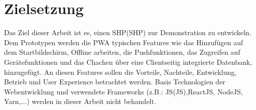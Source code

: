 \newpage
\section{Zielsetzung}\label{sub:Zielsetzung}
Das Ziel dieser Arbeit ist es, einen \acl{SHP}(\acs{SHP}) zur Demonstration zu entwickeln. 
Dem Prototypen werden die \acs{PWA} typischen Features wie das Hinzufügen auf dem Startbildschirm, Offline arbeiten, die Pushfunktionen, 
das Zugreifen auf Gerätefunktionen und das Chachen über eine Clientseitig integrierte Datenbank, hinzugefügt. 
An diesen Features sollen die Vorteile, Nachteile, Entwicklung, Betrieb und User Experience betrachtet werden.
Basis Technologien der Webentwicklung und verwendete Frameworks (z.B.: \acl{JS}(\acs{JS}),ReactJS, NodeJS, Yarn,...) werden in dieser Arbeit nicht behandelt.
